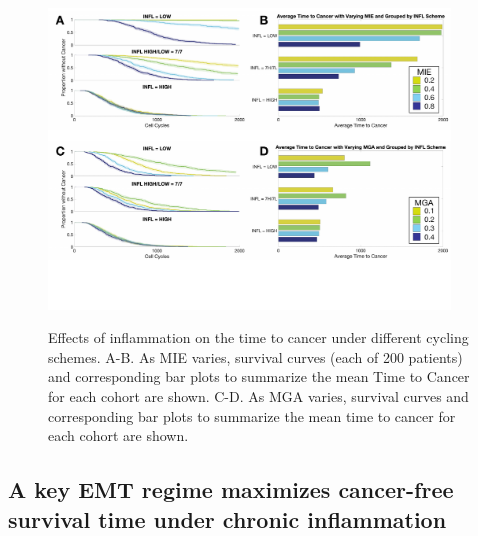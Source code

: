 \documentclass[11pt]{article}
\begin{document}
\begin{figure}
\center
{\includegraphics[width=0.95\textwidth]{Figure4/Figure4.pdf}}
\caption{Effects of inflammation on the time to cancer under different cycling schemes. A-B. As MIE varies, survival curves (each of 200 patients)  and corresponding bar plots to summarize the mean Time to Cancer for each cohort are shown. C-D. As MGA varies, survival curves  and corresponding bar plots to summarize the mean time to cancer for each cohort are shown.}
\label{fig:VaryINFL_and_MesPars}
\end{figure}

\subsection{A key EMT regime maximizes cancer-free survival time under chronic inflammation}\label{KeyEMT}
\end{document}

